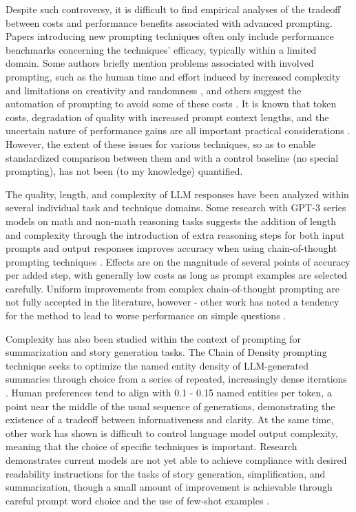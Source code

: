 \documentclass[11pt]{article}
\begin{document}
Despite such controversy, it is difficult to find empirical analyses of the tradeoff between costs and performance benefits associated with advanced prompting. Papers introducing new prompting techniques often only include performance benchmarks concerning the techniques' efficacy, typically within a limited domain. Some authors briefly mention problems associated with involved prompting, such as the human time and effort induced by increased complexity and limitations on creativity and randomness \cite{wu_ai_2022}, and others suggest the automation of prompting to avoid some of these costs \cite{diao_active_2023}. It is known that token costs, degradation of quality with increased prompt context lengths, and the uncertain nature of performance gains are all important practical considerations \cite{gao_prompt_2023}. However, the extent of these issues for various techniques, so as to enable standardized comparison between them and with a control baseline (no special prompting), has not been (to my knowledge) quantified.

The quality, length, and complexity of LLM responses have been analyzed within several individual task and technique domains. Some research with GPT-3 series models on math and non-math reasoning tasks suggests the addition of length and complexity through the introduction of extra reasoning steps for both input prompts and output responses improves accuracy when using chain-of-thought prompting techniques \cite{fu_complexity-based_2023}. Effects are on the magnitude of several points of accuracy per added step, with generally low costs as long as prompt examples are selected carefully. Uniform improvements from complex chain-of-thought prompting are not fully accepted in the literature, however - other work has noted a tendency for the method to lead to worse performance on simple questions \cite{shum_automatic_2023}.

Complexity has also been studied within the context of prompting for summarization and story generation tasks. The Chain of Density prompting technique seeks to optimize the named entity density of LLM-generated summaries through choice from a series of repeated, increasingly dense iterations \cite{adams_sparse_2023}. Human preferences tend to align with 0.1 - 0.15 named entities per token, a point near the middle of the usual sequence of generations, demonstrating the existence of a tradeoff between informativeness and clarity. At the same time, other work has shown is difficult to control language model output complexity, meaning that the choice of specific techniques is important. Research demonstrates current models are not yet able to achieve compliance with desired readability instructions for the tasks of story generation, simplification, and summarization, though a small amount of improvement is achievable through careful prompt word choice and the use of few-shot examples \cite{pu_chatgpt_2023, imperial_flesch_2023}.
\end{document}
